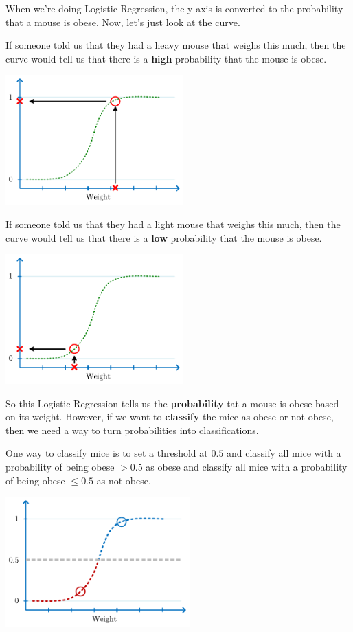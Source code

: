 \documentclass[
	final,
	a4paper,
	oneside,
	parskip=full,
	headings=standardclasses,
	headings=big,
	pointednumbers
]{scrartcl}
\newcommand{\txb}[1]{{\color{blue}#1}}
\newcommand{\txr}[1]{{\color{red}#1}}
\newcommand{\tb}[1]{\textbf{#1}}
\begin{document}
    When we're doing Logistic Regression, the y-axis is converted to the probability
    that a mouse is obese. Now, let's just look at the curve.

    \newpage

    If someone told us that they had a heavy mouse that weighs this much, then the curve would
    tell us that there is a \tb{high} probability that the mouse is obese.

    \begin{center}
        \includegraphics[height=5cm]{StatQuest_ROC_and_AUC_Obese_HighProbability.pdf}
    \end{center}

    If someone told us that they had a light mouse that weighs this much, then the curve
    would tell us that there is a \tb{low} probability that the mouse is obese.

    \begin{center}
        \includegraphics[height=5cm]{StatQuest_ROC_and_AUC_Obese_LowProbability.pdf}
    \end{center}

    So this Logistic Regression tells us the \tb{probability} tat a mouse is
    obese based on its weight. However, if we want to \tb{classify} the mice as
    \txb{obese} or \txr{not obese}, then we need a way to turn probabilities
    into classifications.

    One way to classify mice is to set a threshold at $\bm{0.5}$ and
    classify all mice with a probability of being obese $\bm{> 0.5}$ as \txb{obese}
    and classify all mice with a probability of being obese $\bm{\leq 0.5}$ as \txr{not obese}.

    \begin{center}
        \includegraphics[height=5cm]{StatQuest_ROC_and_AUC_Obese_Threshold.pdf}
    \end{center}



    
\end{document}
